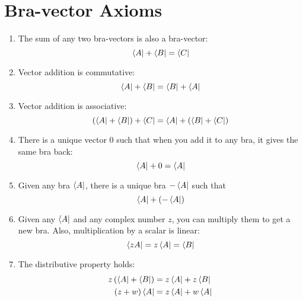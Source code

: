 \documentclass[12pt,a4paper,twocolumn]{article}
\numberwithin{equation}{section}
\begin{document}
\section{Bra-vector Axioms}
\begin{enumerate}
    \item The sum of any two bra-vectors is also a bra-vector:
    \begin{equation}
        \bra{A}  + \bra{B} = \bra{C}
    \end{equation}
    \item Vector addition is commutative:
    \begin{equation}
        \bra{ A } +\bra{ B } =\bra{B} +\bra{A}
    \end{equation}
    \item Vector addition is associative:
    \begin{equation}
        \left(\bra{ A } +\bra{ B }\right)+\bra{ C } =\bra{ A } +  \left(\bra{B }+\bra{ C }\right)
    \end{equation}
    \item There is a unique vector $0$ such that when you add it to any bra, it gives the same bra back:
    \begin{equation}
       \bra{ A } + 0 =\bra{ A }
    \end{equation}
    \item Given any bra $\bra{A}$, there is a unique bra $-\bra{A}$ such that
    \begin{equation}
       \bra{A} + \left( -\bra{A} \right)
    \end{equation}
    \item Given any $\bra{A}$ and any complex number $z$, you can multiply them to get a new bra. Also, multiplication by a scalar is linear:
    \begin{equation}
       \bra{zA} = z\bra{ A } =\bra{B}
    \end{equation}
    \item The distributive property holds:
    \begin{align}
        z\left(\bra{A} +\bra{B}\right) &=  z\bra{A} + z\bra{B}\\
        \left( z+w\right)\bra{A} &= z\bra{A} + w\bra{A}
    \end{align}
\end{enumerate}
\end{document}
